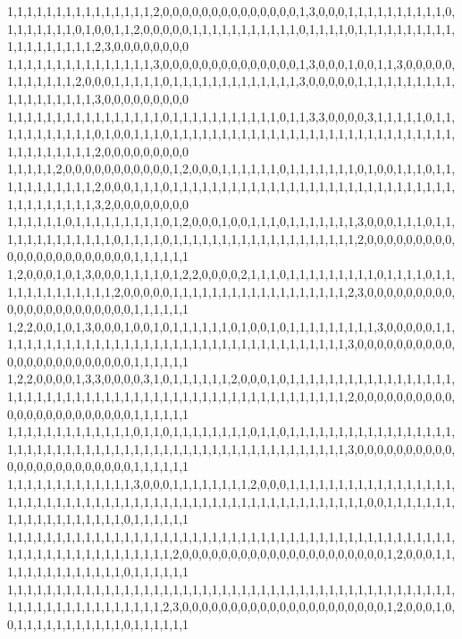 1,1,1,1,1,1,1,1,1,1,1,1,1,1,1,2,0,0,0,0,0,0,0,0,0,0,0,0,0,0,1,3,0,0,0,1,1,1,1,1,1,1,1,1,1,0,1,1,1,1,1,1,1,0,1,0,0,1,1,2,0,0,0,0,0,1,1,1,1,1,1,1,1,1,1,1,0,1,1,1,1,0,1,1,1,1,1,1,1,1,1,1,1,1,1,1,1,1,1,1,1,2,3,0,0,0,0,0,0,0,0
1,1,1,1,1,1,1,1,1,1,1,1,1,1,1,3,0,0,0,0,0,0,0,0,0,0,0,0,0,0,1,3,0,0,0,1,0,0,1,1,3,0,0,0,0,0,1,1,1,1,1,1,1,2,0,0,0,1,1,1,1,1,0,1,1,1,1,1,1,1,1,1,1,1,1,1,3,0,0,0,0,0,1,1,1,1,1,1,1,1,1,1,1,1,1,1,1,1,1,1,1,3,0,0,0,0,0,0,0,0,0
1,1,1,1,1,1,1,1,1,1,1,1,1,1,1,1,0,1,1,1,1,1,1,1,1,1,1,1,0,1,1,3,3,0,0,0,0,3,1,1,1,1,1,0,1,1,1,1,1,1,1,1,1,1,1,0,1,0,0,1,1,1,0,1,1,1,1,1,1,1,1,1,1,1,1,1,1,1,1,1,1,1,1,1,1,1,1,1,1,1,1,1,1,1,1,1,1,1,1,1,1,2,0,0,0,0,0,0,0,0,0
1,1,1,1,1,2,0,0,0,0,0,0,0,0,0,0,0,1,2,0,0,0,1,1,1,1,1,1,0,1,1,1,1,1,1,1,0,1,0,0,1,1,1,0,1,1,1,1,1,1,1,1,1,1,1,2,0,0,0,1,1,1,0,1,1,1,1,1,1,1,1,1,1,1,1,1,1,1,1,1,1,1,1,1,1,1,1,1,1,1,1,1,1,1,1,1,1,1,1,1,1,3,2,0,0,0,0,0,0,0,0
1,1,1,1,1,1,0,1,1,1,1,1,1,1,1,1,0,1,2,0,0,0,1,0,0,1,1,1,0,1,1,1,1,1,1,1,3,0,0,0,1,1,1,0,1,1,1,1,1,1,1,1,1,1,1,1,1,0,1,1,1,1,0,1,1,1,1,1,1,1,1,1,1,1,1,1,1,1,1,1,1,1,2,0,0,0,0,0,0,0,0,0,0,0,0,0,0,0,0,0,0,0,0,0,0,1,1,1,1,1,1
1,2,0,0,0,1,0,1,3,0,0,0,1,1,1,1,0,1,2,2,0,0,0,0,2,1,1,1,0,1,1,1,1,1,1,1,1,1,0,1,1,1,1,0,1,1,1,1,1,1,1,1,1,1,1,1,1,2,0,0,0,0,0,1,1,1,1,1,1,1,1,1,1,1,1,1,1,1,1,1,1,2,3,0,0,0,0,0,0,0,0,0,0,0,0,0,0,0,0,0,0,0,0,0,0,1,1,1,1,1,1
1,2,2,0,0,1,0,1,3,0,0,0,1,0,0,1,0,1,1,1,1,1,1,0,1,0,0,1,0,1,1,1,1,1,1,1,1,1,3,0,0,0,0,0,1,1,1,1,1,1,1,1,1,1,1,1,1,1,1,1,1,1,1,1,1,1,1,1,1,1,1,1,1,1,1,1,1,1,1,1,1,3,0,0,0,0,0,0,0,0,0,0,0,0,0,0,0,0,0,0,0,0,0,0,0,1,1,1,1,1,1
1,2,2,0,0,0,0,1,3,3,0,0,0,0,3,1,0,1,1,1,1,1,1,2,0,0,0,1,0,1,1,1,1,1,1,1,1,1,1,1,1,1,1,1,1,1,1,1,1,1,1,1,1,1,1,1,1,1,1,1,1,1,1,1,1,1,1,1,1,1,1,1,1,1,1,1,1,1,1,1,1,2,0,0,0,0,0,0,0,0,0,0,0,0,0,0,0,0,0,0,0,0,0,0,0,1,1,1,1,1,1
1,1,1,1,1,1,1,1,1,1,1,1,1,0,1,1,0,1,1,1,1,1,1,1,1,0,1,1,0,1,1,1,1,1,1,1,1,1,1,1,1,1,1,1,1,1,1,1,1,1,1,1,1,1,1,1,1,1,1,1,1,1,1,1,1,1,1,1,1,1,1,1,1,1,1,1,1,1,1,1,1,3,0,0,0,0,0,0,0,0,0,0,0,0,0,0,0,0,0,0,0,0,0,0,0,1,1,1,1,1,1
1,1,1,1,1,1,1,1,1,1,1,1,1,3,0,0,0,1,1,1,1,1,1,1,1,2,0,0,0,1,1,1,1,1,1,1,1,1,1,1,1,1,1,1,1,1,1,1,1,1,1,1,1,1,1,1,1,1,1,1,1,1,1,1,1,1,1,1,1,1,1,1,1,1,1,1,1,1,1,1,1,1,1,0,0,1,1,1,1,1,1,1,1,1,1,1,1,1,1,1,1,1,1,1,0,1,1,1,1,1,1
1,1,1,1,1,1,1,1,1,1,1,1,1,1,1,1,1,1,1,1,1,1,1,1,1,1,1,1,1,1,1,1,1,1,1,1,1,1,1,1,1,1,1,1,1,1,1,1,1,1,1,1,1,1,1,1,1,1,1,1,1,1,1,2,0,0,0,0,0,0,0,0,0,0,0,0,0,0,0,0,0,0,0,0,0,1,2,0,0,0,1,1,1,1,1,1,1,1,1,1,1,1,1,1,0,1,1,1,1,1,1
1,1,1,1,1,1,1,1,1,1,1,1,1,1,1,1,1,1,1,1,1,1,1,1,1,1,1,1,1,1,1,1,1,1,1,1,1,1,1,1,1,1,1,1,1,1,1,1,1,1,1,1,1,1,1,1,1,1,1,1,1,1,2,3,0,0,0,0,0,0,0,0,0,0,0,0,0,0,0,0,0,0,0,0,0,1,2,0,0,0,1,0,0,1,1,1,1,1,1,1,1,1,1,1,0,1,1,1,1,1,1

